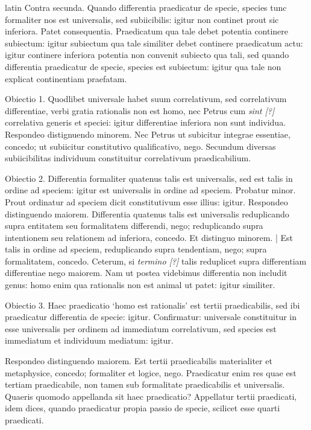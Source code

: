 \begin{otherlanguage*}{latin}
\pstart
 Contra secunda. Quando differentia praedicatur de specie, species tunc formaliter nos est universalis, sed subiicibilis: igitur non continet prout sic inferiora. Patet consequentia. Praedicatum qua tale debet potentia continere subiectum: igitur subiectum qua tale similiter debet continere praedicatum actu: igitur continere inferiora potentia non convenit subiecto qua tali, sed quando differentia praedicatur de specie, species est subiectum: igitur qua tale non explicat continentiam praefatam. 
\pend

\pstart
 Obiectio 1. Quodlibet universale habet suum correlativum, sed correlativum differentiae, verbi gratia rationalis non est homo, nec Petrus cum \emph{sint [?]} correlativa generis et speciei: igitur differentiae inferiora non sunt individua. Respondeo distignuendo minorem. Nec Petrus ut subicitur integrae essentiae, concedo; ut subiicitur constitutivo qualificativo, nego. Secundum diversas subiicibilitas individuum constituitur correlativum praedicabilium. 
\pend

\pstart
 Obiectio 2. Differentia formaliter quatenus talis est universalis, sed est talis in ordine ad speciem: igitur est universalis in ordine ad speciem. Probatur minor. Prout ordinatur ad speciem dicit constitutivum esse illius: igitur. Respondeo distinguendo maiorem. Differentia quatenus talis est universalis reduplicando supra entitatem seu formalitatem differendi, nego; reduplicando supra intentionem seu relationem ad inferiora, concedo. Et distinguo minorem. \textnormal{|}   Est talis in ordine ad speciem, reduplicando supra tendentiam, nego; supra formalitatem, concedo. Ceterum, si \emph{termino [?]} talis reduplicet supra differentiam differentiae nego maiorem. Nam ut postea videbimus differentia non includit genus: homo enim qua rationalis non est animal ut patet: igitur similiter. 
\pend

\pstart
 Obiectio 3. Haec praedicatio `homo est rationalis' est tertii praedicabilis, sed ibi praedicatur differentia de specie: igitur. Confirmatur: universale constituitur in esse universalis per ordinem ad immediatum correlativum, sed species est immediatum et individuum mediatum: igitur. 
\pend

\pstart
 Respondeo distinguendo maiorem. Est tertii praedicabilis materialiter et metaphysice, concedo; formaliter et logice, nego. Praedicatur enim res quae est tertiam praedicabile, non tamen sub formalitate praedicabilis et universalis. Quaeris quomodo appellanda sit haec praedicatio? Appellatur tertii praedicati, idem dices, quando praedicatur propia passio de specie, scilicet esse quarti praedicati. 
\pend


\end{otherlanguage*}
